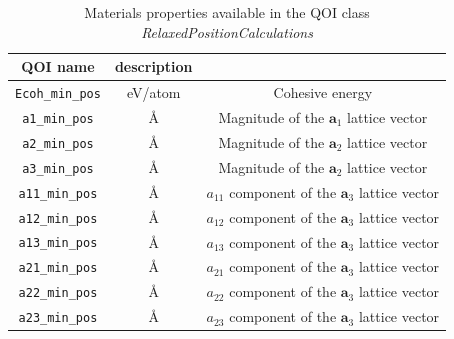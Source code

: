\begin{table}[ht]
	\centering
	\caption{Materials properties available in the QOI class \emph{RelaxedPositionCalculations}}
	\label{tbl:pypospack_qoi_lmps_min_pos}
	\begin{tabular}{ccc}
		\hline
		QOI name & description \\
		\hline
		\verb|Ecoh_min_pos|
			& eV/atom
			& Cohesive energy\\
    \verb|a1_min_pos|
		  & \AA
			& Magnitude of the $\bm{a}_1$ lattice vector \\
		\verb|a2_min_pos|
			& \AA
			& Magnitude of the $\bm{a}_2$ lattice vector \\
		\verb|a3_min_pos|
			& \AA
			& Magnitude of the $\bm{a}_2$ lattice vector \\
    \verb|a11_min_pos|
			& \AA
			& $a_{11}$ component of the $\bm{a}_3$ lattice vector \\
		\verb|a12_min_pos|
			& \AA
			& $a_{12}$ component of the $\bm{a}_3$ lattice vector \\
		\verb|a13_min_pos|
			& \AA
			& $a_{13}$ component of the $\bm{a}_3$ lattice vector \\
    \verb|a21_min_pos|
			& \AA
			& $a_{21}$ component of the $\bm{a}_3$ lattice vector \\
		\verb|a22_min_pos|
			& \AA
			& $a_{22}$ component of the $\bm{a}_3$ lattice vector \\
		\verb|a23_min_pos|
			& \AA
			& $a_{23}$ component of the $\bm{a}_3$ lattice vector \\
		\hline
	\end{tabular}
\end{table}

